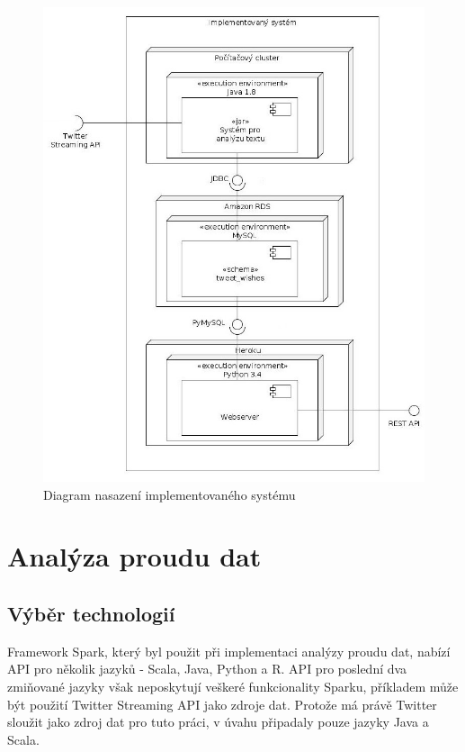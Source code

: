 \documentclass[thesis=B,czech]{FITthesis}[2012/06/26]
\begin{document}
\begin{figure}[h!]
   	\centering
   	\includegraphics[width=1\textwidth]{images/deployment.jpg}
   	\caption{Diagram nasazení implementovaného systému}
   	\label{fig:deployment_diagram}
\end{figure}

\section{Analýza proudu dat}
\label{analysis-implementation}
\subsection{Výběr technologií}
Framework Spark, který byl použit při implementaci analýzy proudu dat, nabízí API pro několik jazyků - Scala, Java, Python a R. API pro poslední dva zmiňované jazyky však neposkytují veškeré funkcionality Sparku, příkladem může být použití Twitter Streaming API jako zdroje dat. Protože má právě Twitter sloužit jako zdroj dat pro tuto práci, v úvahu připadaly pouze jazyky Java a Scala. 
\end{document}
